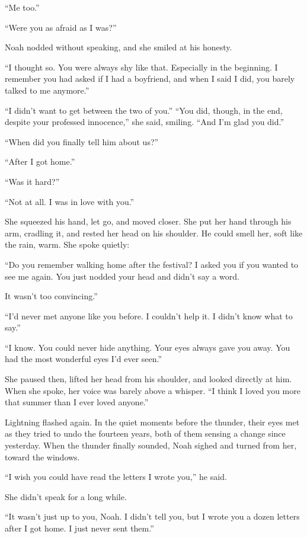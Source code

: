 \documentclass[10pt, twoside, openright]{book}
\begin{document}
``Me too.''

``Were you as afraid as I was?''

Noah nodded without speaking, and she smiled at his honesty.


``I thought so. You were always shy like that. Especially in the
beginning. I remember you had asked if I had a boyfriend, and when I
said I did, you barely talked to me anymore.''

``I didn't want to get between the two of you.'' ``You did, though, in
the end, despite your professed innocence,'' she said, smiling. ``And
I'm glad you did.''


``When did you finally tell him about us?''

``After I got home.''

``Was it hard?''

``Not at all. I was in love with you.''


She squeezed his hand, let go, and moved closer. She put her hand
through his arm, cradling it, and rested her head on his shoulder. He
could smell her, soft like the rain, warm. She spoke quietly:

``Do you remember walking home after the festival? I asked you if you
wanted to see me again. You just nodded your head and didn't say a word.

It wasn't too convincing.''

``I'd never met anyone like you before. I couldn't help it. I didn't
know what to say.''

``I know. You could never hide anything. Your eyes always gave you away.
You had the most wonderful eyes I'd ever seen.''

She paused then, lifted her head from his shoulder, and looked directly
at him. When she spoke, her voice was barely above a whisper. ``I think
I loved you more that summer than I ever loved anyone.''

Lightning flashed again. In the quiet moments before the thunder, their
eyes met as they tried to undo the fourteen years, both of them sensing
a change since yesterday. When the thunder finally sounded, Noah sighed
and turned from her, toward the windows.


``I wish you could have read the letters I wrote you,'' he said.

She didn't speak for a long while.


``It wasn't just up to you, Noah. I didn't tell you, but I wrote you a
dozen letters after I got home. I just never sent them.''
\end{document}
